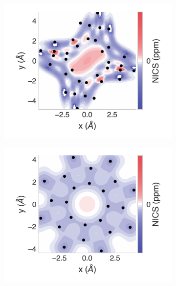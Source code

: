 \documentclass[
	fontsize=10pt, %
	twoside=true, %
	numbers=noenddot, %
]{kaobook}
\begin{document}
\begin{figure}[h]
\begin{subfigure}{5.5cm}\centering\includegraphics{as12-2d}\end{subfigure}
\begin{subfigure}{5.5cm}\centering\includegraphics{asn08-2d}\end{subfigure}%

\end{figure}
\end{document}
